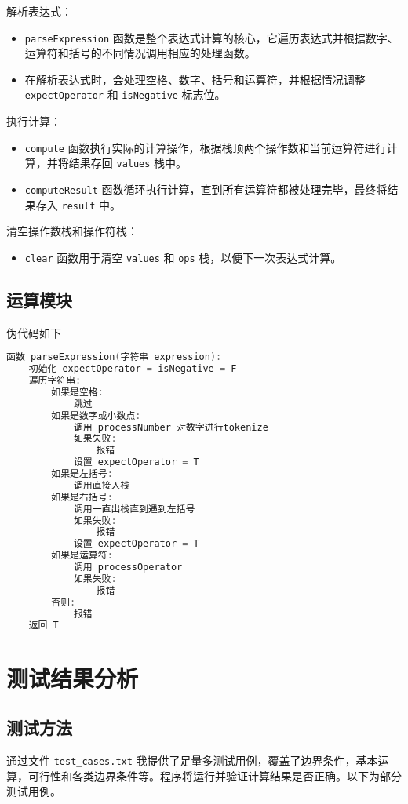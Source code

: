 \documentclass[12pt,a4paper]{article}
\begin{document}
解析表达式：
\begin{itemize}
    \item \texttt{parseExpression} 函数是整个表达式计算的核心，它遍历表达式并根据数字、运算符和括号的不同情况调用相应的处理函数。
    \item 在解析表达式时，会处理空格、数字、括号和运算符，并根据情况调整 \texttt{expectOperator} 和 \texttt{isNegative} 标志位。
\end{itemize}

执行计算：
\begin{itemize}
    \item \texttt{compute} 函数执行实际的计算操作，根据栈顶两个操作数和当前运算符进行计算，并将结果存回 \texttt{values} 栈中。
    \item \texttt{computeResult} 函数循环执行计算，直到所有运算符都被处理完毕，最终将结果存入 \texttt{result} 中。
\end{itemize}

清空操作数栈和操作符栈：
\begin{itemize}
    \item \texttt{clear} 函数用于清空 \texttt{values} 和 \texttt{ops} 栈，以便下一次表达式计算。
\end{itemize}

\subsection{运算模块}
伪代码如下
\begin{lstlisting}[language=C++, basicstyle=\ttfamily\small, frame=single]
    函数 parseExpression(字符串 expression):
    初始化 expectOperator = isNegative = F
    遍历字符串:
        如果是空格:
            跳过
        如果是数字或小数点:
            调用 processNumber 对数字进行tokenize
            如果失败:
                报错
            设置 expectOperator = T
        如果是左括号:
            调用直接入栈
        如果是右括号:
            调用一直出栈直到遇到左括号
            如果失败:
                报错
            设置 expectOperator = T
        如果是运算符:
            调用 processOperator
            如果失败:
                报错
        否则:
            报错 
    返回 T
\end{lstlisting}


\section{测试结果分析}
\subsection{测试方法}
通过文件 \texttt{test\_cases.txt} 我提供了足量多测试用例，覆盖了边界条件，基本运算，可行性和各类边界条件等。程序将运行并验证计算结果是否正确。以下为部分测试用例。
\end{document}
